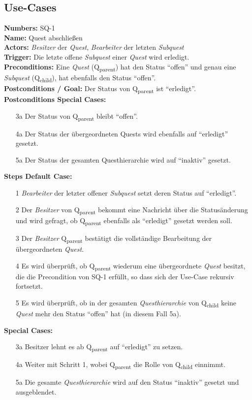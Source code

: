 \documentclass{article}
\begin{document}
\subsection{Use-Cases}

\begin{samepage}
\textbf{Numbers:} SQ-1\\
\textbf{Name:} Quest abschließen\\
\textbf{Actors:} \textit{Besitzer} der \textit{Quest}, \textit{Bearbeiter} der letzten \textit{Subquest} \\
\textbf{Trigger:} Die letzte offene \textit{Subquest} einer \textit{Quest} wird erledigt.\\
\textbf{Preconditions:} Eine \textit{Quest} (Q\textsubscript{parent}) hat den Status ``offen'' und genau eine \textit{Subquest} (Q\textsubscript{child}), hat ebenfalls den Status ``offen''. \\
\textbf{Postconditions / Goal:} Der Status von Q\textsubscript{parent} ist ``erledigt''. \\
\textbf{Postconditions Special Cases:} 
\begin{itemize}
    \item[3a] Der Status von Q\textsubscript{parent} bleibt ``offen''. 
    \item[4a] Der Status der übergeordneten Quests wird ebenfalls auf ``erledigt'' gesetzt. 
    \item[5a] Der Status der gesamten Questhierarchie wird auf ``inaktiv'' gesetzt.
\end{itemize}
\textbf{Steps Default Case:}
\begin{itemize}
    \item[1] \textit{Bearbeiter} der letzter offener \textit{Subquest} setzt deren Status auf ``erledigt''.
    \item[2] Der \textit{Besitzer} von Q\textsubscript{parent} bekommt eine Nachricht über die Statusänderung und wird gefragt, ob Q\textsubscript{parent} ebenfalls  als ``erledigt'' gesetzt werden soll.
    \item[3] Der \textit{Besitzer} Q\textsubscript{parent} bestätigt die vollständige Bearbeitung der übergeordneten \textit{Quest}.
    \item[4] Es wird überprüft, ob Q\textsubscript{parent} wiederum eine übergeordnete \textit{Quest} besitzt, die die Precondition von SQ-1 erfüllt, so dass sich der Use-Case rekursiv fortsetzt. 
    \item[5] Es wird überprüft, ob in der gesamten \textit{Questhierarchie} von Q\textsubscript{child} keine \textit{Quest} mehr den Status ``offen'' hat (in diesem Fall 5a). 
\end{itemize}
\textbf{Special Cases:}
\begin{itemize}
\item [3a] Besitzer lehnt es ab  Q\textsubscript{parent} auf ``erledigt'' zu setzen.
\item [4a] Weiter mit Schritt 1, wobei Q\textsubscript{parent} die Rolle von Q\textsubscript{child} einnimmt. 
\item [5a] Die gesamte \textit{Questhierarchie} wird auf den Status ``inaktiv'' gesetzt und ausgeblendet. 
\end{itemize}
\end{samepage}
\end{document}
